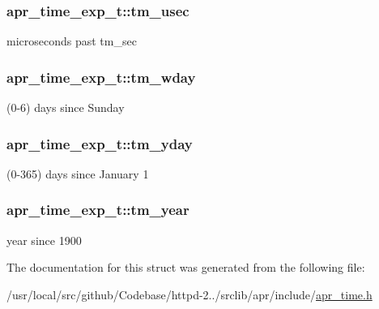 \subsubsection[{\texorpdfstring{tm\+\_\+usec}{tm_usec}}]{ apr\+\_\+time\+\_\+exp\+\_\+t\+::tm\+\_\+usec}\hypertarget{structapr__time__exp__t_ac5f11e3c1f5a30d357df2108296a8d30}{}\label{structapr__time__exp__t_ac5f11e3c1f5a30d357df2108296a8d30}
microseconds past tm\+\_\+sec 
\subsubsection[{\texorpdfstring{tm\+\_\+wday}{tm_wday}}]{ apr\+\_\+time\+\_\+exp\+\_\+t\+::tm\+\_\+wday}\hypertarget{structapr__time__exp__t_a57e892bbf3c52df34dcff2c6a9f1adbf}{}\label{structapr__time__exp__t_a57e892bbf3c52df34dcff2c6a9f1adbf}
(0-\/6) days since Sunday 
\subsubsection[{\texorpdfstring{tm\+\_\+yday}{tm_yday}}]{ apr\+\_\+time\+\_\+exp\+\_\+t\+::tm\+\_\+yday}\hypertarget{structapr__time__exp__t_aa15c7ab0d7e2a974e89cc1470f1583ab}{}\label{structapr__time__exp__t_aa15c7ab0d7e2a974e89cc1470f1583ab}
(0-\/365) days since January 1 
\subsubsection[{\texorpdfstring{tm\+\_\+year}{tm_year}}]{ apr\+\_\+time\+\_\+exp\+\_\+t\+::tm\+\_\+year}\hypertarget{structapr__time__exp__t_a35c32245be49279a6689e34bcd6e534a}{}\label{structapr__time__exp__t_a35c32245be49279a6689e34bcd6e534a}
year since 1900 

The documentation for this struct was generated from the following file\+:\begin{DoxyCompactItemize}
\item 
/usr/local/src/github/\+Codebase/httpd-\/2../srclib/apr/include/\hyperlink{apr__time_8h}{apr\+\_\+time.\+h}\end{DoxyCompactItemize}

